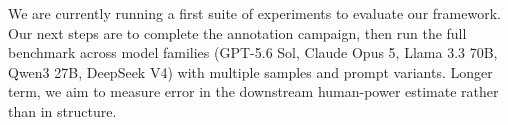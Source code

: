\documentclass{article}
\begin{document}
We are currently running a first suite of experiments to evaluate our framework. Our next steps are to complete the annotation campaign, then run the full benchmark across model families (GPT-5.6 Sol, Claude Opus 5, Llama 3.3 70B, Qwen3 27B, DeepSeek V4) with multiple samples and prompt variants. Longer term, we aim to measure error in the downstream human-power estimate rather than in structure.






\end{document}
